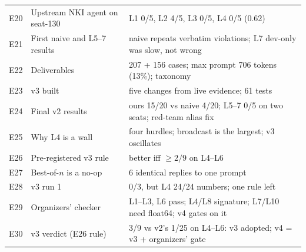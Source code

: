 \documentclass[11pt]{article}
\begin{document}
{\begin{tabularx}{\linewidth}{@{}l>{\raggedright\arraybackslash}p{5.0cm}Y@{}}
E20 & Upstream NKI agent on seat-130 & L1 0/5, L2 4/5, L3 0/5, L4 0/5 (0.62) \\
E21 & First naive and L5--7 results & naive repeats verbatim violations; L7 dev-only was slow, not wrong \\
E22 & Deliverables & 207 + 156 cases; max prompt 706 tokens (13\%); taxonomy \\
E23 & v3 built & five changes from live evidence; 61 tests \\
E24 & Final v2 results & ours 15/20 vs naive 4/20; L5--7 0/5 on two seats; red-team alias fix \\
E25 & Why L4 is a wall & four hurdles; broadcast is the largest; v3 oscillates \\
E26 & Pre-registered v3 rule & better iff $\ge2/9$ on L4--L6 \\
E27 & Best-of-$n$ is a no-op & 6 identical replies to one prompt \\
E28 & v3 run 1 & 0/3, but L4 24/24 numbers; one rule left \\
E29 & Organizers' checker & L1--L3, L6 pass; L4/L8 signature; L7/L10 need float64; v4 gates on it \\
E30 & v3 verdict (E26 rule) & 3/9 vs v2's 1/25 on L4--L6: v3 adopted; v4 = v3 + organizers' gate \\
\bottomrule
\end{tabularx}}
\end{document}
